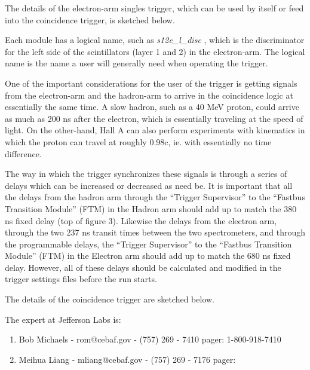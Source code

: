 
	The details of the electron-arm singles trigger, which
can be used by itself or feed into the coincidence trigger, is sketched below.


	Each module has a logical name, such as {\sl s12e\_l\_disc }, which is the discriminator for the left side of the scintillators (layer 1 and 2) in the electron-arm.  The logical name is the name a user will generally need when operating the trigger.

	One of the important considerations for the user of the trigger is getting signals from the electron-arm and the hadron-arm to arrive in the coincidence logic at essentially the same time.  A slow hadron, such as a 40 MeV proton,  could arrive as much as 200 ns after the electron,  which is essentially traveling at the speed of light.  On the other-hand,  Hall A can also perform experiments with kinematics in which the proton can travel at roughly 0.98c,  ie. with essentially no time difference. 

	The way in which the trigger synchronizes these signals is through a series of delays which can be increased or decreased as need be. It is important that all the delays from the hadron arm through the ``Trigger Supervisor'' to the ``Fastbus Transition Module'' (FTM) in the Hadron arm should add up to match the 380 ns fixed delay (top of figure 3).  Likewise the delays from the electron arm, through the two 237 ns transit times between the two spectrometers, and through the programmable delays, the ``Trigger Supervisor'' to the ``Fastbus Transition Module'' (FTM) in the Electron arm should add up to match the 680 ns fixed delay.  However,  all of these delays should be calculated and modified in the trigger settings files before the run starts.  

	The details of the coincidence trigger are sketched below.



	The expert at Jefferson Labs is:

\begin{enumerate}

	\item Bob Michaels -  rom@cebaf.gov - (757) 269 - 7410
		pager: 1-800-918-7410

	\item Meihua Liang - mliang@cebaf.gov - (757) 269 - 7176
		pager: 

\end{enumerate}

